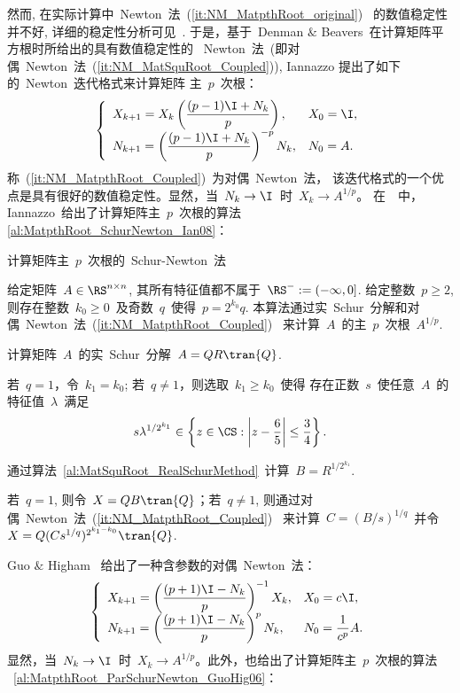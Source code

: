 然而, 在实际计算中~Newton~法~(\ref{it:NM_MatpthRoot_original})~
的数值稳定性并不好, 详细的稳定性分析可见~\cite[3.2~节]{Smith2003}.
于是，基于~Denman $\&$
Beavers~在计算矩阵平方根时所给出的具有数值稳定性的
~Newton~法~(即对偶~Newton~法~(\ref{it:NM_MatSquRoot_Coupled})),
Iannazzo \cite{Iannazzo2006}提出了如下的~Newton~迭代格式来计算矩阵
主~$p$~次根：
\begin{equation}
\label{it:NM_MatpthRoot_Coupled} \left\{
\begin{array}{ll}
\displaystyle X_{k + 1} = X_k \left(\frac{(p-1)\I + N_k}{p}\right),
& X_0 = \I, \\
\displaystyle N_{k + 1} = \left(\frac{(p-1)\I + N_k}{p}\right)^{- p}
N_k, & N_0 = A.
\end{array} \right.
\end{equation}
称~(\ref{it:NM_MatpthRoot_Coupled})~为对偶~Newton~法，
该迭代格式的一个优点是具有很好的数值稳定性。显然，当~$N_k \to
\I$~时~$X_k \to A^{1/p}$。 在~\cite{Iannazzo2008}~中，
Iannazzo~给出了计算矩阵主~$p$~次根的算法~
\ref{al:MatpthRoot_SchurNewton_Ian08}：

\begin{algorithm}[h!]
\caption{计算矩阵主~$p$~次根的~Schur-Newton~法~\cite[算法~
3]{Iannazzo2008}} \label{al:MatpthRoot_SchurNewton_Ian08}
给定矩阵~$A\in\RS^{n\times n}$, 其所有特征值都不属于~$\RS^- :=
(-\infty,0]$. 给定整数~$p\geq 2$, 则存在整数~$k_0 \geq
0$~及奇数~$q$~使得~$p = 2^{k_0}q$.
本算法通过实~Schur~分解和对偶~Newton~法~(\ref{it:NM_MatpthRoot_Coupled})~
来计算~$A$~的主~$p$~次根~$A^{1/p}$.
\begin{list}{.}{
\setlength{\rightmargin}{0em}\setlength{\leftmargin}{1.2em}}
\item
计算矩阵~$A$~的实~Schur~分解~$A = QR\tran{Q}$.
\item
若~$q=1$，令~$k_1 = k_0$; 若~$q\neq1$，则选取~$k_1\geq k_0$~使得
存在正数~$s$~使任意~$A$~的特征值~$\lambda$~满足
$$
s \lambda^{1/{2^{k_1}}} \in \left\{z\in \CS: \left|z -
\frac{6}{5}\right| \leq \frac{3}{4}\right\}.
$$
\item
通过算法~\ref{al:MatSquRoot_RealSchurMethod}~计算~$B =
R^{1/{2^{k_1}}}$.
\item
若~$q=1$, 则令~$X = QB\tran{Q}$；若~$q\neq 1$,
则通过对偶~Newton~法~(\ref{it:NM_MatpthRoot_Coupled})~ 来计算~$C =
(B/s)^{1/q}$~并令~$X = Q(Cs^{1/q})^{2^{k_1-k_0}}\tran{Q}$.
\end{list}
\end{algorithm}


Guo $\&$ Higham
\cite{GuoHigham2006}~给出了一种含参数的对偶~Newton~法：
\begin{equation}
\label{it:NM_MatpthRoot_ParCoupled} \left\{
\begin{array}{ll}
\displaystyle X_{k + 1} = \left(\frac{(p+1)\I -
N_k}{p}\right)^{-1}X_k,
& X_0 = c\I, \\
\displaystyle N_{k + 1} = \left(\frac{(p+1)\I - N_k}{p}\right)^p
N_k, & \displaystyle N_0 = \frac{1}{c^p}A.
\end{array} \right.
\end{equation}
显然，当~$N_k \to \I$~时~$X_k \to
A^{1/p}$。此外，也给出了计算矩阵主~$p$~次根的算法
~\ref{al:MatpthRoot_ParSchurNewton_GuoHig06}：

